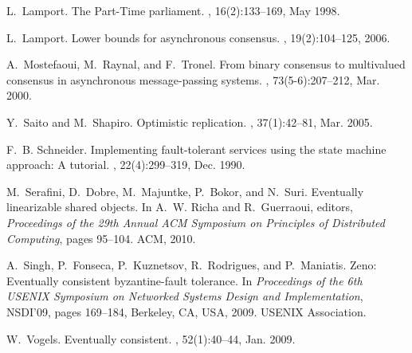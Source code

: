 \documentclass[11pt]{article}
\begin{document}
\begin{thebibliography}{10}
L.~Lamport.
\newblock The {Part-Time} parliament.
, 16(2):133--169, May 1998.

L.~Lamport.
\newblock Lower bounds for asynchronous consensus.
, 19(2):104--125, 2006.

A.~Mostefaoui, M.~Raynal, and F.~Tronel.
\newblock From binary consensus to multivalued consensus in asynchronous
  message-passing systems.
, 73(5-6):207--212, Mar. 2000.

Y.~Saito and M.~Shapiro.
\newblock Optimistic replication.
, 37(1):42--81, Mar. 2005.

F.~B. Schneider.
\newblock Implementing fault-tolerant services using the state machine
  approach: A tutorial.
, 22(4):299--319, Dec. 1990.

M.~Serafini, D.~Dobre, M.~Majuntke, P.~Bokor, and N.~Suri.
\newblock Eventually linearizable shared objects.
\newblock In A.~W. Richa and R.~Guerraoui, editors, {\em Proceedings of the
  29th Annual ACM Symposium on Principles of Distributed Computing}, pages
  95--104. ACM, 2010.

A.~Singh, P.~Fonseca, P.~Kuznetsov, R.~Rodrigues, and P.~Maniatis.
\newblock Zeno: Eventually consistent byzantine-fault tolerance.
\newblock In {\em Proceedings of the 6th USENIX Symposium on Networked Systems
  Design and Implementation}, NSDI'09, pages 169--184, Berkeley, CA, USA, 2009.
  USENIX Association.

W.~Vogels.
\newblock Eventually consistent.
, 52(1):40--44, Jan. 2009.

\end{thebibliography}

\newpage

\appendix
\end{document}
